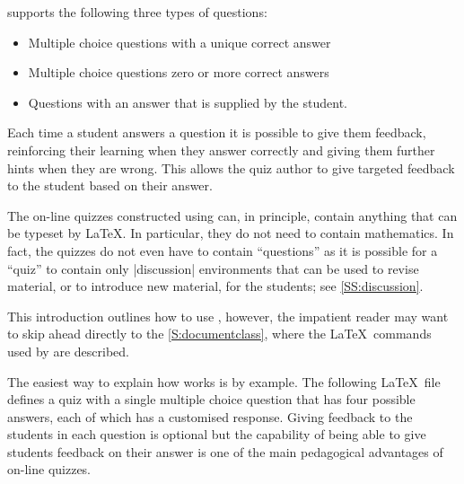 \documentclass[svgnames]{article}
\begin{document}
    \WebQuiz supports the following three types of questions:
    \begin{itemize}
      \item Multiple choice questions with a unique correct answer
      \item Multiple choice questions zero or more correct answers
      \item Questions with an answer that is supplied by the student.
    \end{itemize}
    Each time a student answers a question it is possible to give them
    feedback, reinforcing their learning when they answer correctly and
    giving them further hints when they are wrong. This allows the
    quiz author to give targeted feedback to the student based on their
    answer.

    The on-line quizzes constructed using \WebQuiz can, in principle,
    contain anything that can be typeset by \LaTeX. In particular, they
    do not need to contain mathematics. In fact, the quizzes do not even
    have to contain ``questions'' as it is possible for a \WebQuiz
    ``quiz'' to contain only \LatexCode|discussion| environments that can
    be used to revise material, or to introduce new material, for the
    students; see \autoref{SS:discussion}.

    This introduction outlines how to use \WebQuiz, however, the
    impatient reader may want to skip ahead directly to the
    \autoref{S:documentclass}, where the \LaTeX\ commands used by
    \WebQuiz are described.

    The easiest way to explain how \WebQuiz works is by example. The
    following \LaTeX\ file defines a quiz with a single multiple choice
    question that has four possible answers, each of which has a
    customised response. Giving feedback to the students in each
    question is optional but the capability of being able to give
    students feedback on their answer is one of the main pedagogical
    advantages of on-line quizzes.

\end{document}
